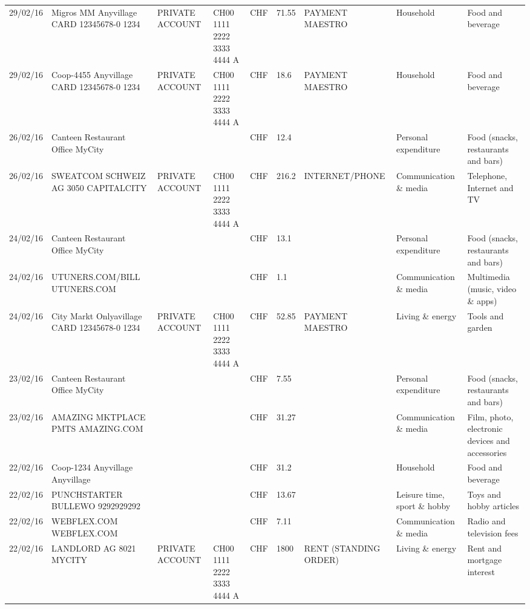 \begin{landscape}
\begin{table}[t]
\begin{center}
\begin{tabular}{lllllllll}
		29/02/16 & Migros MM Anyvillage CARD 12345678-0 1234 & PRIVATE ACCOUNT & CH00 1111 2222 3333 4444 A & CHF   & 71.55 & PAYMENT MAESTRO & Household & Food and beverage \\
		29/02/16 & Coop-4455 Anyvillage CARD 12345678-0 1234 & PRIVATE ACCOUNT & CH00 1111 2222 3333 4444 A & CHF   & 18.6  & PAYMENT MAESTRO & Household & Food and beverage \\
		26/02/16 & Canteen Restaurant Office      MyCity &       &       & CHF   & 12.4  &       & Personal expenditure & Food (snacks, restaurants and bars) \\
		26/02/16 & SWEATCOM SCHWEIZ AG 3050 CAPITALCITY & PRIVATE ACCOUNT & CH00 1111 2222 3333 4444 A & CHF   & 216.2 & INTERNET/PHONE & Communication \& media & Telephone,  Internet and TV \\
		24/02/16 & Canteen Restaurant Office      MyCity &       &       & CHF   & 13.1  &       & Personal expenditure & Food (snacks, restaurants and bars) \\
		24/02/16 & UTUNERS.COM/BILL          UTUNERS.COM &       &       & CHF   & 1.1   &       & Communication \& media & Multimedia (music, video \& apps) \\
		24/02/16 & City Markt Onlyavillage CARD 12345678-0 1234 & PRIVATE ACCOUNT & CH00 1111 2222 3333 4444 A & CHF   & 52.85 & PAYMENT MAESTRO & Living \& energy & Tools and garden \\
		23/02/16 & Canteen Restaurant Office      MyCity &       &       & CHF   & 7.55  &       & Personal expenditure & Food (snacks, restaurants and bars) \\
		23/02/16 & AMAZING MKTPLACE PMTS     AMAZING.COM &       &       & CHF   & 31.27 &       & Communication \& media & Film, photo, electronic devices and accessories \\
		22/02/16 & Coop-1234 Anyvillage    Anyvillage &       &       & CHF   & 31.2  &       & Household & Food and beverage \\
		22/02/16 & PUNCHSTARTER BULLEWO   9292929292 &       &       & CHF   & 13.67 &       & Leisure time, sport \& hobby & Toys and hobby articles \\
		22/02/16 & WEBFLEX.COM              WEBFLEX.COM &       &       & CHF   & 7.11  &       & Communication \& media & Radio and television fees \\
		22/02/16 & LANDLORD AG 8021 MYCITY & PRIVATE ACCOUNT & CH00 1111 2222 3333 4444 A & CHF   & 1800  & RENT (STANDING ORDER) & Living \& energy & Rent and mortgage interest \\

\end{tabular}
\end{center}
\end{table}
\end{landscape}
